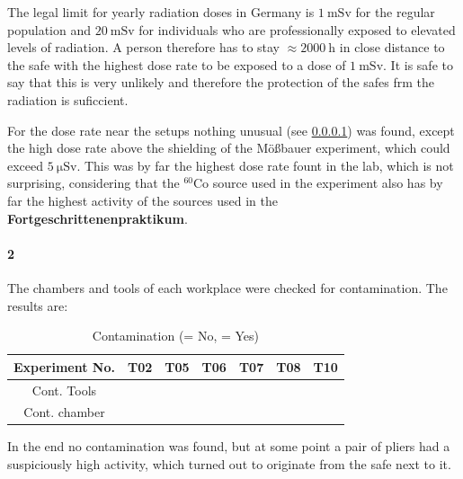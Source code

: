 \documentclass[12pt,twoside,a4paper]{scrartcl}
\newcommand{\xmark}{\ding{55}}%
\begin{document}
			The legal limit for yearly radiation doses in Germany is $\SI{1}{\milli \sievert}$ for the regular population and $\SI{20}{\milli \sievert}$ for individuals who are professionally exposed to elevated levels of radiation. A person therefore has to stay $\approx \SI{2000}{\hour}$ in close distance to the safe with the highest dose rate to be exposed to a dose of $\SI{1}{\milli \sievert}$. It is safe to say that this is very unlikely and therefore the protection of the safes frm the radiation is suficcient.

			For the dose rate near the setups nothing unusual (see \ref{Contamination}) was found, except the high dose rate above the shielding of the Mößbauer experiment, which could exceed $\SI{5}{\micro \sievert}$. This was by far the highest dose rate fount in the lab, which is not surprising, considering that the $^60$Co source used in the experiment also has by far the highest activity of the sources used in the \textbf{Fortgeschrittenenpraktikum}.

		\paragraph{2}
		\label{Contamination}
			The chambers and tools of each workplace were checked for contamination. The results are:

			\begin{table}[H]
				\centering
				\caption{Contamination (\xmark = No, \checkmark = Yes)}
				\begin{tabular}{|c|c|c|c|c|c|c|}
					\hline
					Experiment No. & T02 & T05 & T06 & T07 & T08 & T10 \\ \hline
					Cont. Tools 	 & \xmark & \xmark & \xmark & \xmark & \xmark & \xmark \\
					Cont. chamber  & \xmark & \xmark & \xmark & \xmark & \xmark & \xmark \\ \hline
				\end{tabular}
			\end{table}

			In the end no contamination was found, but at some point a pair of pliers had a suspiciously high activity, which turned out to originate from the safe next to it.
\end{document}
